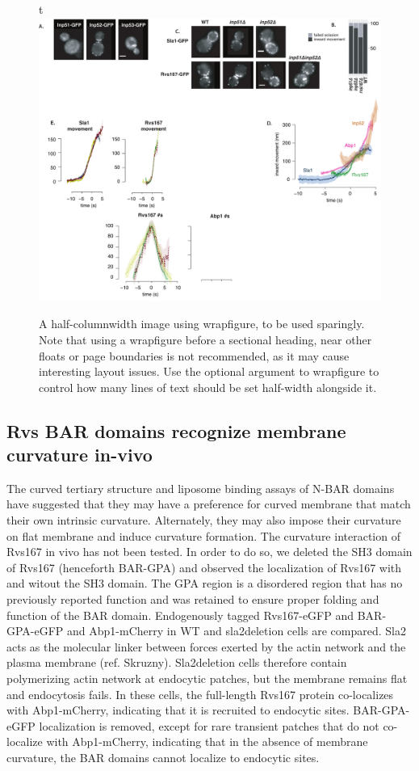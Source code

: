 \documentclass[9pt,lineno]{elife}
\begin{document}
\begin{figure}[h]
t 	\includegraphics[width=\hsize]{figures/inp4}
	\caption{A half-columnwidth image using wrapfigure, to be used sparingly. Note that using a wrapfigure before a sectional heading, near other floats or page boundaries is not recommended, as it may cause interesting layout issues. Use the optional argument to wrapfigure to control how many lines of text should be set half-width alongside it.}
	\label{fig:halfwidth}
\end{figure}



\subsection{Rvs BAR domains recognize membrane curvature in-vivo}
The curved tertiary structure and liposome binding assays of N-BAR domains have suggested that they may have a preference for curved membrane that match their own intrinsic curvature. Alternately, they may also impose their curvature on flat membrane and induce curvature formation. The curvature interaction of Rvs167 in vivo has not been tested. In order to do so, we deleted the SH3 domain of Rvs167 (henceforth BAR-GPA) and observed the localization of Rvs167 with and witout the SH3 domain. The GPA region is a disordered region that has no previously reported function and was retained to ensure proper folding and function of the BAR domain. Endogenously tagged Rvs167-eGFP and BAR-GPA-eGFP and Abp1-mCherry in WT and sla2deletion cells are compared. Sla2 acts as the molecular linker between forces exerted by the actin network and the plasma membrane (ref. Skruzny). Sla2deletion cells therefore contain polymerizing actin network at endocytic patches, but the membrane remains flat and endocytosis fails. In these cells, the full-length Rvs167 protein co-localizes with Abp1-mCherry, indicating that it is recruited to endocytic sites. BAR-GPA-eGFP localization is removed, except for rare transient patches that do not co-localize with Abp1-mCherry, indicating that in the absence of membrane curvature, the BAR domains  cannot localize to endocytic sites. 
\end{document}
